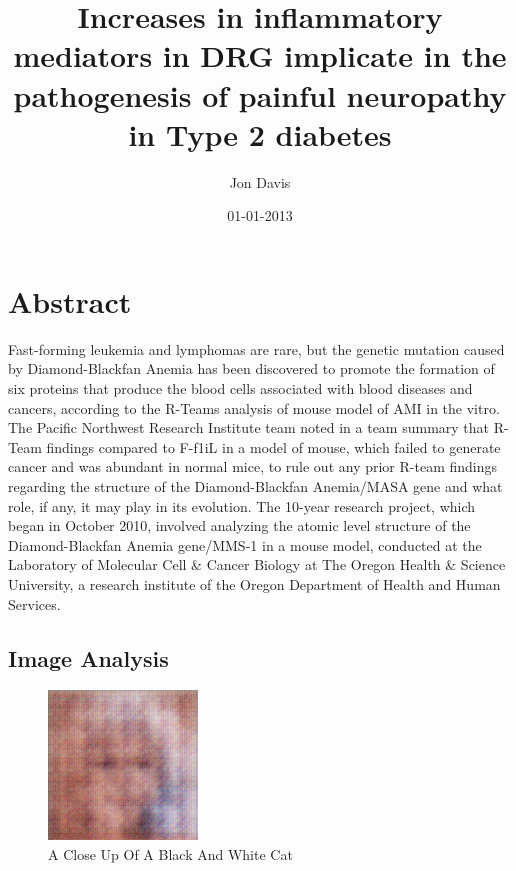 \documentclass{article}%
\title{Increases in inflammatory mediators in DRG implicate in the pathogenesis of painful neuropathy in Type 2 diabetes}%
\author{Jon Davis}%
\affil{Department of Molecular and Human Genetics, Baylor College of Medicine, Houston, Texas, United States of America}%
\date{01{-}01{-}2013}%
\begin{document}
%
\normalsize%
\maketitle%
\section{Abstract}%
\label{sec:Abstract}%
Fast{-}forming leukemia and lymphomas are rare, but the genetic mutation caused by Diamond{-}Blackfan Anemia has been discovered to promote the formation of six proteins that produce the blood cells associated with blood diseases and cancers, according to the R{-}Teams analysis of mouse model of AMI in the vitro.\newline%
The Pacific Northwest Research Institute team noted in a team summary that R{-}Team findings compared to F{-}f1iL in a model of mouse, which failed to generate cancer and was abundant in normal mice, to rule out any prior R{-}team findings regarding the structure of the Diamond{-}Blackfan Anemia/MASA gene and what role, if any, it may play in its evolution.\newline%
The 10{-}year research project, which began in October 2010, involved analyzing the atomic level structure of the Diamond{-}Blackfan Anemia gene/MMS{-}1 in a mouse model, conducted at the Laboratory of Molecular Cell \& Cancer Biology at The Oregon Health \& Science University, a research institute of the Oregon Department of Health and Human Services.

%
\subsection{Image Analysis}%
\label{subsec:ImageAnalysis}%


\begin{figure}[h!]%
\centering%
\includegraphics[width=150px]{500_fake_images/samples_5_323.png}%
\caption{A Close Up Of A Black And White Cat}%
\end{figure}

%
\end{document}
